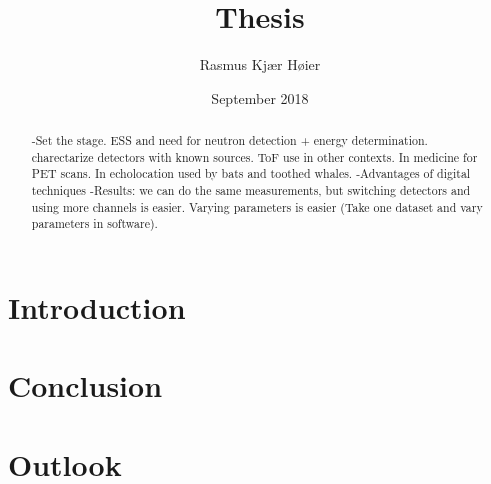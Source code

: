 \documentclass{article}
\title{Thesis}
\author{Rasmus Kjær Høier}
\date{September 2018}
\begin{document}
\maketitle

\tableofcontents

\begin{abstract}
-Set the stage. ESS and need for neutron detection + energy determination. charectarize detectors with known sources. ToF use in other contexts. In medicine for PET scans. In echolocation used by bats and toothed whales.
-Advantages of digital techniques
-Results: we can do the same measurements, but switching detectors and using more channels is easier. Varying parameters is easier (Take one dataset and vary parameters in software).
\end{abstract}
\newpage

\section{Introduction}









\section{Conclusion}

\section{Outlook}







\end{document}
